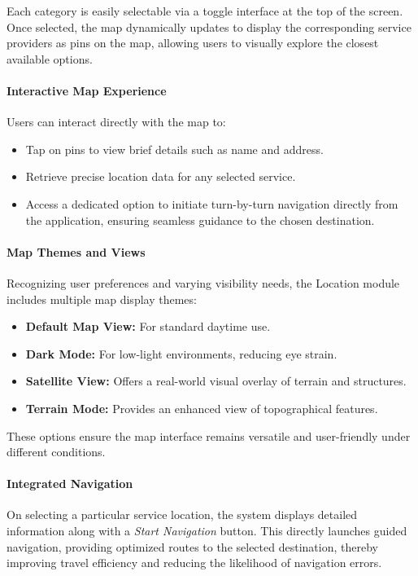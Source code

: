 Each category is easily selectable via a toggle interface at the top of the screen. Once selected, the map dynamically updates to display the corresponding service providers as pins on the map, allowing users to visually explore the closest available options.

\paragraph{Interactive Map Experience}

Users can interact directly with the map to:

\begin{itemize}
    \item Tap on pins to view brief details such as name and address.
    \item Retrieve precise location data for any selected service.
    \item Access a dedicated option to initiate turn-by-turn navigation directly from the application, ensuring seamless guidance to the chosen destination.
\end{itemize}

\paragraph{Map Themes and Views}

Recognizing user preferences and varying visibility needs, the Location module includes multiple map display themes:

\begin{itemize}
    \item \textbf{Default Map View:} For standard daytime use.
    \item \textbf{Dark Mode:} For low-light environments, reducing eye strain.
    \item \textbf{Satellite View:} Offers a real-world visual overlay of terrain and structures.
    \item \textbf{Terrain Mode:} Provides an enhanced view of topographical features.
\end{itemize}

These options ensure the map interface remains versatile and user-friendly under different conditions.

\paragraph{Integrated Navigation}

On selecting a particular service location, the system displays detailed information along with a \textit{Start Navigation} button. This directly launches guided navigation, providing optimized routes to the selected destination, thereby improving travel efficiency and reducing the likelihood of navigation errors.


